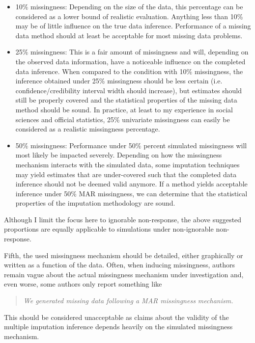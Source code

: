 \documentclass[bimj,fleqn]{w-art}
\theoremstyle{plain}
\theoremstyle{definition}
\begin{document}
\begin{itemize}
  \item 10\% missingness: Depending on the size of the data, this percentage can be considered as a lower bound of realistic evaluation. Anything less than 10\% may be of little influence on the true data inference. Performance of a missing data method should at least be acceptable for most missing data problems. 
  \item 25\% missingness: This is a fair amount of missingness and will, depending on the observed data information, have a noticeable influence on the completed data inference. When compared to the condition with 10\% missingness, the inference obtained under 25\% missingness should be less certain (i.e. confidence/credibility interval width should increase), but estimates should still be properly covered and the statistical properties of the missing data method should be sound. In practice, at least to my experience in social sciences and official statistics, 25\% univariate missingness can easily be considered as a realistic missingness percentage. 
  \item 50\% missingness: Performance under 50\% percent simulated missingness will most likely be impacted severely. Depending on how the missingness mechanism interacts with the simulated data, some imputation techniques may yield estimates that are under-covered such that the completed data inference should not be deemed valid anymore. If a method yields acceptable inference under 50\% MAR missingness, we can determine that the statistical properties of the imputation methodology are sound. 
\end{itemize}
Although I limit the focus here to ignorable non-response, the above suggested proportions are equally applicable to simulations under non-ignorable non-response.

Fifth, the used missingness mechanism should be detailed, either graphically or written as a function of the data. Often, when inducing missingness, authors remain vague about the actual missingness mechanism under investigation and, even worse, some authors only report something like
\begin{quote}
\emph{We generated missing data following a MAR missingness mechanism.}
\end{quote}
This should be considered unacceptable as claims about the validity of the multiple imputation inference depends heavily on the simulated missingness mechanism. 

\end{document}
